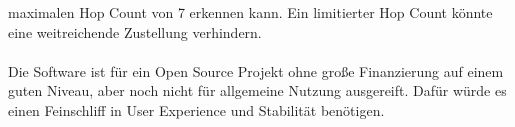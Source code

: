 \documentclass[12pt,a4paper]{article}
\begin{document}
maximalen Hop Count von 7 erkennen kann.
Ein limitierter Hop Count könnte eine weitreichende Zustellung verhindern.\\
\\
Die Software ist für ein Open Source Projekt ohne große Finanzierung auf einem guten Niveau,
aber noch nicht für allgemeine Nutzung ausgereift. Dafür würde es einen Feinschliff in User Experience und Stabilität benötigen.\\
\end{document}
